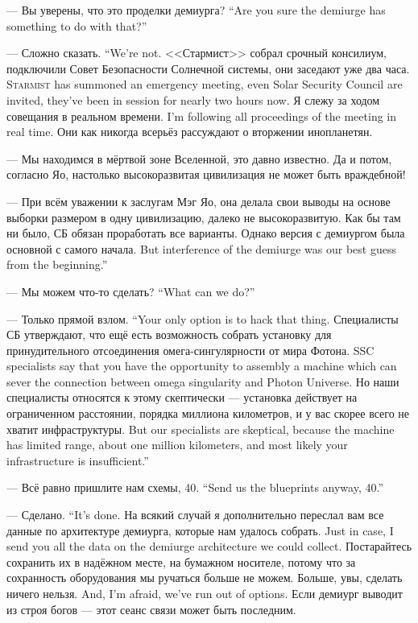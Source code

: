 {--- Вы уверены, что это проделки демиурга?}
{``Are you sure the demiurge has something to do with that?''}

{--- Сложно сказать.}
{``We're not.}
{<<Стармист>> собрал срочный консилиум, подключили Совет Безопасности Солнечной системы, они заседают уже два часа.}
{\textsc{Starmist} has summoned an emergency meeting, even Solar Security Council are invited, they've been in session for nearly two hours now.}
{Я слежу за ходом совещания в реальном времени.}
{I'm following all proceedings of the meeting in real time.}
Они как никогда всерьёз рассуждают о вторжении инопланетян.

--- Мы находимся в мёртвой зоне Вселенной, это давно известно.
Да и потом, согласно Яо, настолько высокоразвитая цивилизация не может быть враждебной!

--- При всём уважении к заслугам Мэг Яо, она делала свои выводы на основе выборки размером в одну цивилизацию, далеко не высокоразвитую.
Как бы там ни было, СБ обязан проработать все варианты.
{Однако версия с демиургом была основной с самого начала.}
{But interference of the demiurge was our best guess from the beginning.''}

{--- Мы можем что-то сделать?}
{``What can we do?''}

{--- Только прямой взлом.}
{``Your only option is to hack that thing.}
{Специалисты СБ утверждают, что ещё есть возможность собрать установку для принудительного отсоединения омега-сингулярности от мира Фотона.}
{SSC specialists say that you have the opportunity to assembly a machine which can sever the connection between omega singularity and Photon Universe.}
{Но наши специалисты относятся к этому скептически --- установка действует на ограниченном расстоянии, порядка миллиона километров, и у вас скорее всего не хватит инфраструктуры.}
{But our specialists are skeptical, because the machine has limited range, about one million kilometers, and most likely your infrastructure is insufficient.''}

{--- Всё равно пришлите нам схемы, 40.}
{``Send us the blueprints anyway, 40.''}

{--- Сделано.}
{``It's done.}
{На всякий случай я дополнительно переслал вам все данные по архитектуре демиурга, которые нам удалось собрать.}
{Just in case, I send you all the data on the demiurge architecture we could collect.}
Постарайтесь сохранить их в надёжном месте, на бумажном носителе, потому что за сохранность оборудования мы ручаться больше не можем.
{Больше, увы, сделать ничего нельзя.}
{And, I'm afraid, we've run out of options.}
Если демиург выводит из строя богов --- этот сеанс связи может быть последним.

